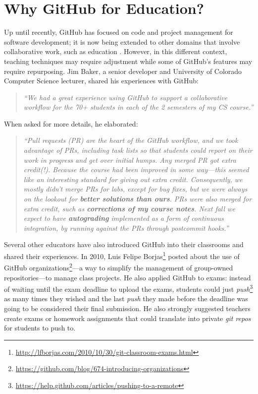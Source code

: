 \section{Why GitHub for Education?}
Up until recently, GitHub has focused on code and project management for software development; it is now being extended to other domains that involve collaborative work, such as education \cite{Griffin:2013:GCJ:2458539.2458551}. However, in this different context, teaching techniques may require adjustment while some of GitHub's features may require repurposing. Jim Baker, a senior developer and University of Colorado Computer Science lecturer, shared his experiences with GitHub: \begin{quote}\textit{``We had a great experience using GitHub to support a collaborative workflow for the 70+ students in each of the 2 semesters of my CS course.''}\end{quote} When asked for more details, he elaborated: \begin{quote}\textit{``Pull requests (PR) are the heart of the GitHub workflow, and we took advantage of PRs, including task lists so that students could report on their work in progress and get over initial humps. Any merged PR got extra credit(!). Because the course had been improved in some way---this seemed like an interesting standard for giving out extra credit. Consequently, we mostly didn't merge PRs for labs, except for bug fixes, but we were always on the lookout for \textbf{better solutions than ours}. PRs were also merged for extra credit, such as \textbf{corrections of my course notes}. Next fall we expect to have \textbf{autograding} implemented as a form of continuous integration, by running against the PRs through postcommit hooks.''}\end{quote}

Several other educators have also introduced GitHub into their classrooms and shared their experiences. In 2010, Luis Felipe Borjas\footnote{\url{http://lfborjas.com/2010/10/30/git-classroom-exams.html}} posted about the use of GitHub organizations\footnote{\url{https://github.com/blog/674-introducing-organizations}}---a way to simplify the management of group-owned repositories---to manage class projects. He also applied GitHub to exams: instead of waiting until the exam deadline to upload the exams, students could just \textit{push}\footnote{\url{https://help.github.com/articles/pushing-to-a-remote}} as many times they wished and the last \textit{push} they made before the deadline was going to be considered their final submission. He also strongly suggested teachers create exams or homework assignments that could translate into private \textit{git repos} for students to push to.

